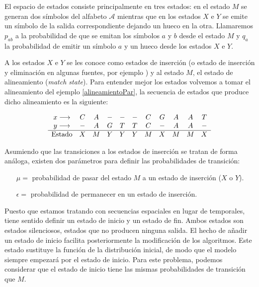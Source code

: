 
El espacio de estados consiste principalmente en tres estados: en el estado $M$ se generan dos símbolos del alfabeto $\mathcal{A}$ mientras que en los estados $X$ e $Y$ se emite un símbolo de la salida correspondiente dejando un hueco en la otra. Llamaremos $p_{ab}$ a la probabilidad de que se emitan los símbolos $a$ y $b$ desde el estado $M$ y $q_{a}$ la probabilidad de emitir un símbolo $a$ y un hueco desde los estados $X$ e $Y$.

A los estados $X$ e $Y$ se les conoce como estados de inserción (o estado de inserción y eliminación en algunas fuentes, por ejemplo \cite{Marina}) y al estado $M$, el estado de alineamiento (\textit{match state}). Para entender mejor los estados volvemos a tomar el alineamiento del ejemplo \ref{alineamientoPar}, la secuencia de estados que produce dicho alineamiento es la siguiente:

\begin{exampleth}
    \[\begin{array}{c c c c c c c c c c c}
       x \longrightarrow & C & A & - & - & - & C & G & A & A & T \\
       y \longrightarrow & - & A & G & T & T & C & - & A & A & - \\
       \hline 
       \text{Estado} & X & M & Y & Y & Y & M & X & M & M & X 
    \end{array}\]
\end{exampleth}

Asumiendo que las transiciones a los estados de inserción se tratan de forma análoga, existen dos parámetros para definir las probabilidades de transición:
\begin{itemize}
    \item[$\mu=$] probabilidad de pasar del estado $M$ a un estado de inserción ($X$ o $Y$).
    \item[$\epsilon=$] probabilidad de permanecer en un estado de inserción.
\end{itemize}

Puesto que estamos tratando con secuencias espaciales en lugar de temporales, tiene sentido definir un estado de inicio y un estado de fin. Ambos estados son estados silenciosos, estados que no producen ninguna salida. El hecho de añadir un estado de inicio facilita posteriormente la modificación de los algoritmos. Este estado sustituye la función de la distribución inicial, de modo que el modelo siempre empezará por el estado de inicio. Para este problema, podemos considerar que el estado de inicio tiene las mismas probabilidades de transición que $M$.

